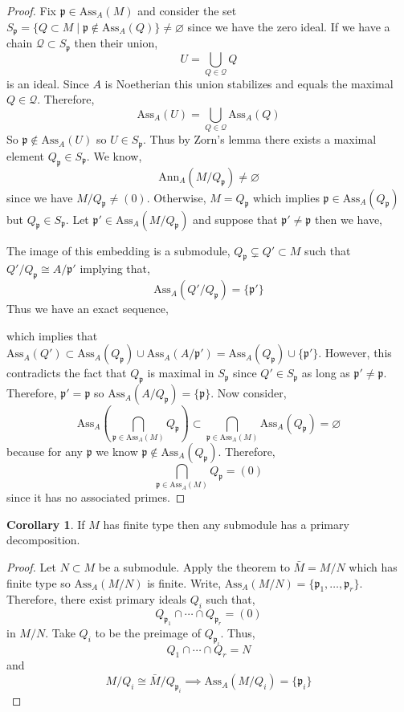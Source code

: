 \documentclass[12pt]{article}
\newcommand{\Ann}[2]{\mathrm{Ann}_{#1}\left(#2\right)}
\newcommand{\Ass}[2]{\mathrm{Ass}_{#1}\left( #2 \right)}
\newcommand{\p}{\mathfrak{p}}
\theoremstyle{remark}
\theoremstyle{definition}
\newtheorem{corollary}[theorem]{Corollary}
\begin{document}
\begin{proof}
Fix $\p \in \Ass{A}{M}$ and consider the set $S_{\p} = \{ Q \subset M \mid \p \notin \Ass{A}{Q} \} \neq \varnothing$ since we have the zero ideal. If we have a chain $\mathcal{Q} \subset S_{\p}$ then their union,
\[ U = \bigcup_{Q \in \mathcal{Q}} Q \]
is an ideal. Since $A$ is Noetherian this union stabilizes and equals the maximal $Q \in \mathcal{Q}$. Therefore,
\[ \Ass{A}{U} = \bigcup_{Q \in \mathcal{Q}} \Ass{A}{Q} \]
So $\p \notin \Ass{A}{U}$ so $U \in S_\p$. Thus by Zorn's lemma there exists a maximal element $Q_\p \in S_\p$. We know,
\[ \Ann{A}{M / Q_\p}  \neq \varnothing \]
since we have $M / Q_\p \neq (0)$. Otherwise, $M = Q_\p$ which implies $\p \in \Ass{A}{Q_\p}$ but $Q_\p \in S_\p$. Let $\p' \in \Ass{A}{M / Q_\p}$ and suppose that $\p' \neq \p$ then we have,
\begin{center}
\end{center}    
The image of this embedding is a submodule, $Q_\p \subsetneq Q' \subset M$ such that $Q' / Q_\p \cong A / \p'$ implying that,
\[ \Ass{A}{Q' / Q_\p} = \{ \p' \} \]
Thus we have an exact sequence,
\begin{center}
\end{center}
which implies that $\Ass{A}{Q'} \subset \Ass{A}{Q_\p} \cup \Ass{A}{A / \p'} =  \Ass{A}{Q_\p} \cup \{ \p' \}$.
However, this contradicts the fact that $Q_\p$ is maximal in $S_\p$ since $Q' \in S_\p$ as long as $\p' \neq \p$. Therefore, $\p' = \p$ so $\Ass{A}{A / Q_\p} = \{ \p \}$. Now consider,
\[ \Ass{A}{\bigcap_{\p \in \Ass{A}{M}} Q_\p} \subset \bigcap_{\p \in \Ass{A}{M}} \Ass{A}{Q_\p} = \varnothing \]
because for any $\p$ we know $\p \notin \Ass{A}{Q_\p}$. Therefore,
\[ \bigcap_{\p \in \Ass{A}{M}} Q_\p = (0) \]
since it has no associated primes. 
\end{proof}

\begin{corollary}
If $M$ has finite type then any submodule has a primary decomposition. 
\end{corollary}

\begin{proof}
Let $N \subset M$ be a submodule. 
Apply the theorem to $\bar{M} = M / N$ which has finite type so $\Ass{A}{M / N}$ is finite. Write, $\Ass{A}{M / N} = \{ \p_1, \dots, \p_r \}$. Therefore, there exist primary ideals $Q_i$ such that,
\[ Q_{\p_1} \cap \cdots \cap Q_{\p_r} = (0) \]
in $M / N$. Take $Q_i$ to be the preimage of $Q_{\p_i}$. Thus,
\[ Q_1 \cap \cdots \cap Q_r = N \]
and 
\[ M / Q_i \cong \bar{M} / Q_{\p_i} \implies \Ass{A}{M / Q_i} = \{ \p_i \} \]
\end{proof}
\end{document}
